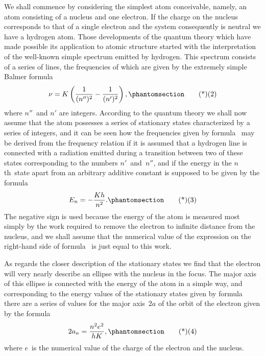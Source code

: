  We shall commence by considering the
simplest atom conceivable, namely, an atom consisting of a nucleus
and one electron. If the charge on the nucleus corresponds to that
of a single electron and the system consequently is neutral we have
a hydrogen atom. Those developments of the quantum theory which
have made possible its application to atomic structure started with
the interpretation of the well-known simple spectrum emitted by
hydrogen. This spectrum consists of a series of lines, the frequencies
of which are given by the extremely simple Balmer formula
\[
\nu = K\left(\frac{1}{(n'')^{2}} - \frac{1}{(n')^{2}}\right),
\Tag{(2)}
\]
where $n''$~and $n'$ are integers. According to the quantum theory
we shall now assume that the atom possesses a series of stationary
states characterized by a series of integers, and it can be seen how
the frequencies given by formula~ may be derived from the
frequency relation if it is assumed that a hydrogen line is connected
with a radiation emitted during a transition between two
of these states corresponding to the numbers $n'$~and~$n''$, and if the
energy in the $n$th~state apart from an arbitrary additive constant
is supposed to be given by the formula
\[
E_{n} = -\frac{Kh}{n^{2}}.
\Tag{(3)}
\]
The negative sign is used because the energy of the atom is
measured most simply by the work required to remove the electron
to infinite distance from the nucleus, and we shall assume that the
numerical value of the expression on the right-hand side of formula~
is just equal to this work.

As regards the closer description of the stationary states we find
that the electron will very nearly describe an ellipse with the
nucleus in the focus. The major axis of this ellipse is connected
with the energy of the atom in a simple way, and corresponding to
the energy values of the stationary states given by formula~
there are a series of values for the major axis~$2a$ of the orbit of the
electron given by the formula
\[
2a_{n} = \frac{n^{2} e^{2}}{hK},
\Tag{(4)}
\]
where $e$~is the numerical value of the charge of the electron and
the nucleus.

